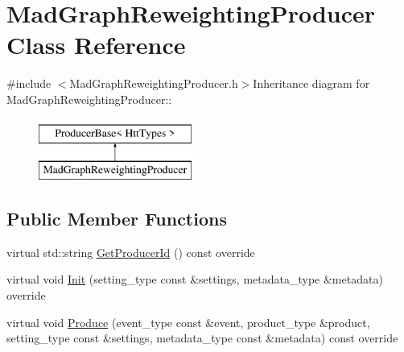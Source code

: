\hypertarget{classMadGraphReweightingProducer}{
\section{MadGraphReweightingProducer Class Reference}
\label{classMadGraphReweightingProducer}
}


{\ttfamily \#include $<$MadGraphReweightingProducer.h$>$}Inheritance diagram for MadGraphReweightingProducer::\begin{figure}[H]
\begin{center}
\leavevmode
\includegraphics[height=2cm]{classMadGraphReweightingProducer}
\end{center}
\end{figure}
\subsection*{Public Member Functions}
\begin{DoxyCompactItemize}
\item 
virtual std::string \hyperlink{classMadGraphReweightingProducer_ac328cc517c9eaf3f374c64a1d7cb3bdf}{GetProducerId} () const override
\item 
virtual void \hyperlink{classMadGraphReweightingProducer_a4b2593bc0cfb1e7379a794fc3f8db1a6}{Init} (setting\_\-type const \&settings, metadata\_\-type \&metadata) override
\item 
virtual void \hyperlink{classMadGraphReweightingProducer_a96bff51580315adc573dba50c5412f91}{Produce} (event\_\-type const \&event, product\_\-type \&product, setting\_\-type const \&settings, metadata\_\-type const \&metadata) const override
\end{DoxyCompactItemize}


